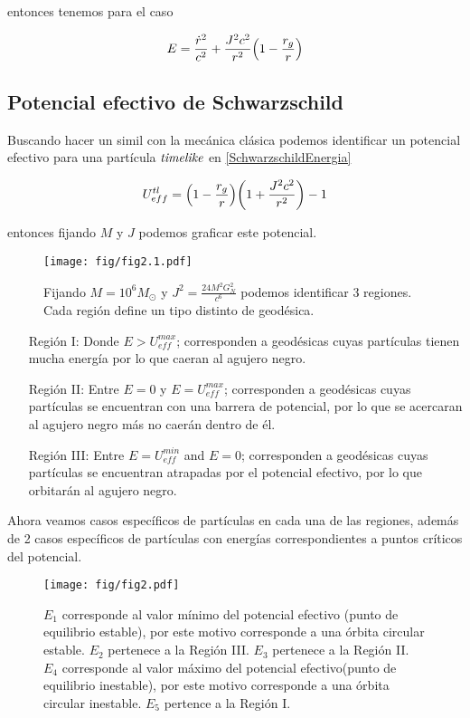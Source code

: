 \documentclass[../Main.tex]{subfiles}
\begin{document}
entonces tenemos para el caso \nl

\begin{equation}
    E = \dfrac{\dot{r}^{2}}{c^{2}} + \dfrac{J^{2}c^{2}}{r^{2}}\qty(1-\dfrac{r_{g}}{r})
    \label{NullEnergy}
\end{equation}

\subsection{Potencial efectivo de Schwarzschild}
Buscando hacer un simil con la mecánica clásica podemos identificar un potencial efectivo para una partícula $\textit{timelike}$ en \eqref{SchwarzschildEnergia}

\begin{equation}
    U_{eff}^{tl} = \qty(1-\dfrac{r_{g}}{r})\qty(1 + \dfrac{J^{2}c^{2}}{r^{2}})-1
    \label{PotencialEfectivo}
\end{equation}

entonces fijando $M$ y $J$ podemos graficar este potencial.

\begin{figure}[ht]
    \centering
    \texttt{[image: fig/fig2.1.pdf]}
    \label{potencial:regionestimelike}
    \caption{Fijando $M=10^6 M_\odot$ y $J^2=\frac{24M^2G^2_N}{c^6}$ podemos identificar 3 regiones. Cada región define un tipo distinto de geodésica.}
\end{figure}

\begin{itemize}
    \item [Región I:] Donde $E>U^{max}_{eff}$; corresponden a geodésicas cuyas partículas tienen mucha energía por lo que caeran al agujero negro.
    \item [Región II:] Entre $E=0$ y $E=U^{max}_{eff}$; corresponden a geodésicas cuyas partículas se encuentran con una barrera de potencial, por lo que se acercaran al agujero negro más no caerán dentro de él.
    \item [Región III:] Entre $E=U^{min}_{eff}$ and $E=0$; corresponden a geodésicas cuyas partículas se encuentran atrapadas por el potencial efectivo, por lo que orbitarán al agujero negro.
\end{itemize}

Ahora veamos casos específicos de partículas en cada una de las regiones, además de 2 casos específicos de partículas con energías correspondientes a puntos críticos del potencial.

\begin{figure}[ht]
    \texttt{[image: fig/fig2.pdf]}
    \label{potencial:particulas}
    \caption{$E_1$ corresponde al valor mínimo del potencial efectivo (punto de equilibrio estable), por este motivo corresponde a una órbita circular estable. $E_2$ pertenece a la Región III. $E_3$ pertenece a la Región II. $E_4$ corresponde al valor máximo del potencial efectivo(punto de equilibrio inestable), por este motivo corresponde a una órbita circular inestable. $E_5$ pertence a la Región I.}
\end{figure}
\end{document}
